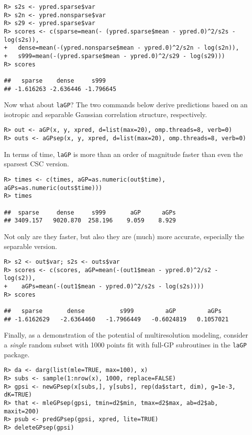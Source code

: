\documentclass[12pt]{article}
\begin{document}
{\singlespacing
\begin{verbatim}
R> s2s <- ypred.sparse$var
R> s2n <- ypred.nonsparse$var
R> s29 <- ypred.sparse$var
R> scores <- c(sparse=mean(- (ypred.sparse$mean - ypred.0)^2/s2s - log(s2s)),
+   dense=mean(-(ypred.nonsparse$mean - ypred.0)^2/s2n - log(s2n)),
+   s999=mean(-(ypred.sparse$mean - ypred.0)^2/s29 - log(s29)))
R> scores

##   sparse    dense     s999 
## -1.616263 -2.636446 -1.796645
\end{verbatim}}

Now what about {\tt laGP}?  The two commands below derive predictions based on
an isotropic and separable Gaussian correlation structure, respectively.

{\singlespacing
\begin{verbatim}
R> out <- aGP(x, y, xpred, d=list(max=20), omp.threads=8, verb=0)
R> outs <- aGPsep(x, y, xpred, d=list(max=20), omp.threads=8, verb=0)
\end{verbatim}}

\noindent In terms of time, {\tt laGP} is more than an order of magnitude
faster than even the sparsest CSC version.

{\singlespacing
\begin{verbatim}
R> times <- c(times, aGP=as.numeric(out$time), aGPs=as.numeric(outs$time)))
R> times

##  sparse     dense     s999       aGP      aGPs 
## 3409.157   9020.870  258.196    9.059    8.929
\end{verbatim}}

\noindent Not only are they faster, but also they are (much) more accurate,
especially the separable version.

{\singlespacing
\begin{verbatim}
R> s2 <- out$var; s2s <- outs$var
R> scores <- c(scores, aGP=mean(-(out1$mean - ypred.0)^2/s2 - log(s2)),
+    aGPs=mean(-(out1$mean - ypred.0)^2/s2s - log(s2s))))
R> scores

##   sparse       dense          s999         aGP         aGPs 
## -1.6162629   -2.6364460   -1.7966449   -0.6024819   0.1057021
\end{verbatim}}

Finally, as a demonstration of the potential of multiresolution modeling,
consider a {\em single} random subset with 1000 points fit with full-GP
subroutines in the {\tt laGP} package.

{\singlespacing
\begin{verbatim}
R> da <- darg(list(mle=TRUE, max=100), x)
R> subs <- sample(1:nrow(x), 1000, replace=FALSE)
R> gpsi <- newGPsep(x[subs,], y[subs], rep(da$start, dim), g=1e-3, dK=TRUE)
R> that <- mleGPsep(gpsi, tmin=d2$min, tmax=d2$max, ab=d2$ab, maxit=200)
R> psub <- predGPsep(gpsi, xpred, lite=TRUE)
R> deleteGPsep(gpsi)
\end{verbatim}}
\end{document}
